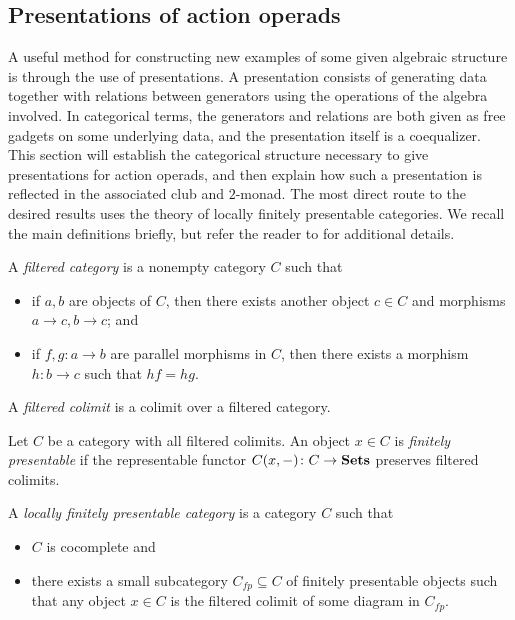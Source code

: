 \subsection{Presentations of action operads}\label{sec:presofacops}
A useful method for constructing new examples of some given algebraic structure is through the use of presentations. A presentation consists of generating data together with relations between generators using the operations of the algebra involved. In categorical terms, the generators and relations are both given as free gadgets on some underlying data, and the presentation itself is a coequalizer. This section will establish the categorical structure necessary to give presentations for action operads, and then explain how such a presentation is reflected in the associated club and $2$-monad. The most direct route to the desired results uses the theory of locally finitely presentable categories. We recall the main definitions briefly, but refer the reader to \cite{ar} for additional details.

\begin{Defi}\label{def:filtered}
  A \textit{filtered category} is a nonempty category $C$ such that
    \begin{itemize}
      \item if $a,b$ are objects of $C$, then there exists another object $c \in C$ and morphisms $a \rightarrow c, b \rightarrow c$; and
      \item if $f,g \colon a \rightarrow b$ are parallel morphisms in $C$, then there exists a morphism $h \colon b \rightarrow c$ such that $hf = hg$.
    \end{itemize}
\end{Defi}

\begin{Defi}
  A \emph{filtered colimit} is a colimit over a filtered category.
\end{Defi}

\begin{Defi}
  Let $C$ be a category with all filtered colimits. An object $x \in C$ is \textit{finitely presentable} if the representable functor $C(x, -) \colon C \rightarrow \mathbf{Sets}$ preserves filtered colimits.
\end{Defi}

\begin{Defi}
  A \textit{locally finitely presentable category} is a category $C$ such that
  \begin{itemize}
    \item $C$ is cocomplete and
    \item there exists a small subcategory $C_{fp} \subseteq C$ of finitely presentable objects such that any object $x \in C$ is the filtered colimit of some diagram in $C_{fp}$.
  \end{itemize}
\end{Defi}

